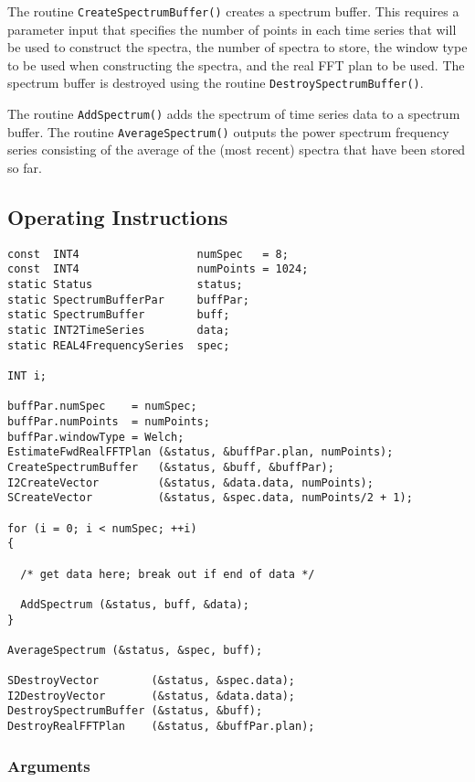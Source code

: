 \documentclass{article}
\begin{document}
The routine \texttt{CreateSpectrumBuffer()} creates a spectrum buffer.  This
requires a parameter input that specifies the number of points in each time
series that will be used to construct the spectra, the number of spectra to
store, the window type to be used when constructing the spectra, and the real
FFT plan to be used.  The spectrum buffer is destroyed using the routine
\texttt{DestroySpectrumBuffer()}.

The routine \texttt{AddSpectrum()} adds the spectrum of time series data to a
spectrum buffer.  The routine \texttt{AverageSpectrum()} outputs the power
spectrum frequency series consisting of the average of the (most recent)
spectra that have been stored so far.

\subsection{Operating Instructions}

\begin{verbatim}
const  INT4                  numSpec   = 8;
const  INT4                  numPoints = 1024;
static Status                status;
static SpectrumBufferPar     buffPar;
static SpectrumBuffer        buff;
static INT2TimeSeries        data;
static REAL4FrequencySeries  spec;

INT i;

buffPar.numSpec    = numSpec;
buffPar.numPoints  = numPoints;
buffPar.windowType = Welch;
EstimateFwdRealFFTPlan (&status, &buffPar.plan, numPoints);
CreateSpectrumBuffer   (&status, &buff, &buffPar);
I2CreateVector         (&status, &data.data, numPoints);
SCreateVector          (&status, &spec.data, numPoints/2 + 1);

for (i = 0; i < numSpec; ++i)
{

  /* get data here; break out if end of data */

  AddSpectrum (&status, buff, &data);
}

AverageSpectrum (&status, &spec, buff);

SDestroyVector        (&status, &spec.data);
I2DestroyVector       (&status, &data.data);
DestroySpectrumBuffer (&status, &buff);
DestroyRealFFTPlan    (&status, &buffPar.plan);
\end{verbatim}

\subsubsection{Arguments}
\end{document}
